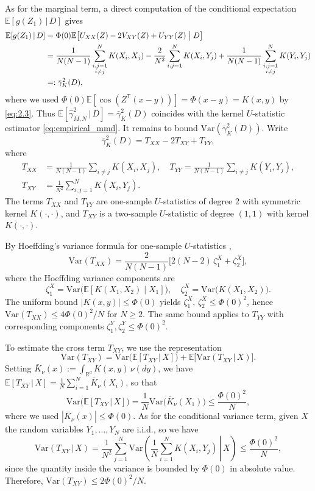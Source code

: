 \documentclass[11pt,leqno]{article}
\theoremstyle{plain}
\theoremstyle{remark}
\theoremstyle{definition}
\numberwithin{equation}{section}
\numberwithin{figure}{section}
\numberwithin{table}{section}
\numberwithin{algorithm}{section}
\newcommand{\EE}{\mathbb{E}}
\newcommand{\RR}{\mathbb{R}}
\begin{document}
As for the marginal term, a direct computation of the conditional expectation $\EE[g(Z_1)\,|\, D]$ gives 
\begin{equation}
\label{eq:6.tower}
\begin{aligned}
 \EE[g(Z_1)\,|\, D]
 &= \Phi(0)\EE\bigl[U_{XX}(Z) - 2V_{XY}(Z) + U_{YY}(Z) \bigm| D\bigr]  \\
 &= \frac{1}{N(N-1)}\sum_{\substack{i,j=1\\i\neq j}}^N K(X_i,X_j)
   - \frac{2}{N^2}\sum_{i,j=1}^N K(X_i,Y_j)
   + \frac{1}{N(N-1)}\sum_{\substack{i,j=1\\i\neq j}}^N K(Y_i,Y_j) \\
 &=: \bar{\gamma}_K^2(D), 
\end{aligned}
\end{equation}
where we used $\Phi(0)\EE[\cos(Z^{\mathsf{T}}(x-y))] = \Phi(x-y) = K(x,y)$ by \eqref{eq:2.3}.
Thus $\EE[\hat{\gamma}_{M,N}^2\,|\, D] = \bar{\gamma}_K^2(D)$ coincides with
the kernel $U$-statistic estimator \eqref{eq:empirical_mmd}.
It remains to bound $\mathrm{Var}(\bar{\gamma}_K^2(D))$.
Write
\[
 \bar{\gamma}_K^2(D) = T_{XX} - 2 T_{XY} + T_{YY},
\]
where
\begin{align*}
 T_{XX} &= \frac{1}{N(N-1)}\sum_{i\neq j} K(X_i,X_j),\quad
 T_{YY} = \frac{1}{N(N-1)}\sum_{i\neq j} K(Y_i,Y_j),\\
 T_{XY} &= \frac{1}{N^2}\sum_{i,j=1}^{N} K(X_i,Y_j).
\end{align*}
The terms $T_{XX}$ and $T_{YY}$ are one-sample $U$-statistics of degree $2$
with symmetric kernel $K(\cdot,\cdot)$,
and $T_{XY}$ is a two-sample $U$-statistic of degree $(1,1)$ with kernel $K(\cdot,\cdot)$.

By Hoeffding's variance formula for one-sample $U$-statistics
\cite[Section~5.2]{ser:1980},
\[
 \mathrm{Var}(T_{XX}) = \frac{2}{N(N-1)}\bigl[2(N-2)\,\zeta_1^{X} + \zeta_2^{X}\bigr],
\]
where the Hoeffding variance components are
\[
 \zeta_1^{X} = \mathrm{Var}\bigl(\EE[K(X_1,X_2)\mid X_1]\bigr),\quad
 \zeta_2^{X} = \mathrm{Var}\bigl(K(X_1,X_2)\bigr).
\]
The uniform bound $|K(x,y)|\le \Phi(0)$ yields $\zeta_1^{X},\,\zeta_2^{X}\le \Phi(0)^2$,
hence $\mathrm{Var}(T_{XX}) \le 4\Phi(0)^2/N$ for $N\ge 2$.
The same bound applies to $T_{YY}$ with corresponding components $\zeta_1^{Y}, \zeta_2^{Y}\le\Phi(0)^2$.

To estimate the cross term $T_{XY}$, we use the representation
\[
 \mathrm{Var}(T_{XY}) = \mathrm{Var}\bigl(\EE[T_{XY}\,|\, X]\bigr) + \EE\bigl[\mathrm{Var}(T_{XY}\,|\, X)\bigr].
\]
Setting $\bar{K}_{\nu}(x):=\int_{\RR^d}K(x,y)\,\nu(dy)$, we have
$\EE[T_{XY}\,|\, X] = \frac{1}{N}\sum_{i=1}^N\bar{K}_{\nu}(X_i)$, so that
\[
 \mathrm{Var}\bigl(\EE[T_{XY}\,|\, X]\bigr)
 = \frac{1}{N}\mathrm{Var}\bigl(\bar{K}_{\nu}(X_1)\bigr)
 \le \frac{\Phi(0)^2}{N},
\]
where we used $|\bar{K}_{\nu}(x)|\le \Phi(0)$.
As for the conditional variance term, given $X$ the random variables $Y_1,\ldots,Y_N$ are i.i.d., so we have 
\[
 \mathrm{Var}(T_{XY}\,|\, X)
 = \frac{1}{N^2}\sum_{j=1}^N\mathrm{Var}\left(\left.\frac{1}{N}\sum_{i=1}^N K(X_i,Y_j)\,\right|\, X\right)
 \le \frac{\Phi(0)^2}{N},
\]
since the quantity inside the variance is bounded by $\Phi(0)$ in absolute value.
Therefore, $\mathrm{Var}(T_{XY}) \le 2\Phi(0)^2/N$.
\end{document}
